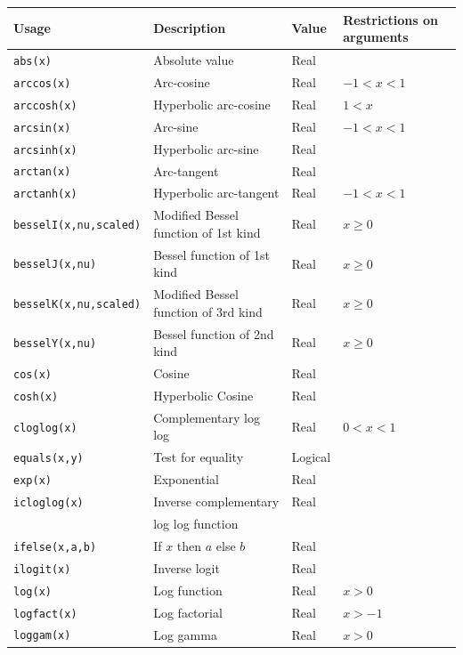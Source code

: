 \documentclass[11pt, a4paper, titlepage]{report}
\begin{document}
\begin{table}
\begin{center}
\begin{tabular}{llll}
\hline
Usage  & Description & Value & Restrictions on arguments \\ 
\hline
\verb+abs(x)+       & Absolute value        & Real & \\
\verb+arccos(x)+    & Arc-cosine            & Real & $-1 < x < 1$\\
\verb+arccosh(x)+   & Hyperbolic arc-cosine & Real & $1 < x$ \\
\verb+arcsin(x)+    & Arc-sine              & Real & $-1 < x < 1$\\
\verb+arcsinh(x)+   & Hyperbolic arc-sine   & Real &\\
\verb+arctan(x)+    & Arc-tangent           & Real &\\
\verb+arctanh(x)+   & Hyperbolic arc-tangent & Real & $-1 < x < 1$\\
\verb+besselI(x,nu,scaled)+ &Modified Bessel function of 1st kind & Real & $x \geq 0$ \\
\verb+besselJ(x,nu)+ &Bessel function of 1st kind & Real & $x \geq 0$ \\
\verb+besselK(x,nu,scaled)+ &Modified Bessel function of 3rd kind & Real & $x \geq 0$ \\
\verb+besselY(x,nu)+ &Bessel function of 2nd kind & Real & $x \geq 0$ \\
\verb+cos(x)+       & Cosine              & Real & \\
\verb+cosh(x)+      & Hyperbolic Cosine   & Real & \\
\verb+cloglog(x)+    & Complementary log log & Real & $0 < x < 1$ \\
\verb+equals(x,y)+   & Test for equality   & Logical & \\
\verb+exp(x)+       & Exponential         & Real & \\
\verb+icloglog(x)+  & Inverse complementary & Real & \\
                    & log log function    & \\
\verb+ifelse(x,a,b)+ & If $x$ then $a$ else $b$ & Real & \\
\verb+ilogit(x)+    & Inverse logit       & Real & \\
\verb+log(x)+       & Log function        & Real & $x > 0$ \\
\verb+logfact(x)+   & Log factorial       & Real & $x > -1$ \\
\verb+loggam(x)+    & Log gamma           & Real & $x > 0$ \\

\end{tabular}
\end{center}
\end{table}
\end{document}
